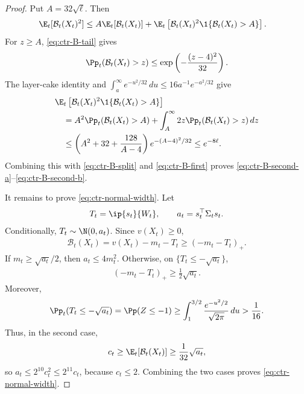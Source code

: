 \begin{proof}
    Put $A=32\sqrt\ell$.  Then
    \begin{align}
        \E_t[\mathcal B_t(X_t)^2]
         & \leq
        A\E_t[\mathcal B_t(X_t)]
        +\E_t\left[
            \mathcal B_t(X_t)^2\1\{\mathcal B_t(X_t)>A\}
            \right].
        \label{eq:ctr-B-split}
    \end{align}
    For $z\geq A$, \eqref{eq:ctr-B-tail} gives
    \begin{align}
        \Pp_t(\mathcal B_t(X_t)>z)
        \leq\exp\left(-\frac{(z-4)^2}{32}\right).
    \end{align}
    The layer-cake identity and
    $\int_a^\infty e^{-u^2/32}\,du\leq16a^{-1}e^{-a^2/32}$ give
    \begin{align}
         & \E_t\left[
            \mathcal B_t(X_t)^2\1\{\mathcal B_t(X_t)>A\}
            \right]
        \\
         & \quad=
        A^2\Pp_t(\mathcal B_t(X_t)>A)
        +\int_A^\infty2z\Pp_t(\mathcal B_t(X_t)>z)\,dz
        \\
         & \quad\leq
        \left(A^2+32+\frac{128}{A-4}\right)
        e^{-(A-4)^2/32}
        \leq e^{-8\ell}.
    \end{align}
    Combining this with \eqref{eq:ctr-B-split} and
    \eqref{eq:ctr-B-first} proves
    \eqref{eq:ctr-B-second-a}--\eqref{eq:ctr-B-second-b}.

    It remains to prove \eqref{eq:ctr-normal-width}.  Let
    \begin{align}
        T_t=\ip{s_t}{W_t},
        \qquad
        a_t=s_t^\top\Sigma_ts_t.
    \end{align}
    Conditionally, $T_t\sim\N(0,a_t)$.  Since $v(X_t)\geq0$,
    \begin{align}
        \mathcal B_t(X_t)
        =v(X_t)-m_t-T_t
        \geq(-m_t-T_t)_+.
        \label{eq:ctr-shortfall}
    \end{align}
    If $m_t\geq\sqrt{a_t}/2$, then $a_t\leq4m_t^2$.  Otherwise, on
    $\{T_t\leq-\sqrt{a_t}\}$,
    \begin{align}
        (-m_t-T_t)_+\geq\frac12\sqrt{a_t}.
    \end{align}
    Moreover,
    \begin{align}
        \Pp_t(T_t\leq-\sqrt{a_t})
        =\Pp(Z\leq-1)
        \geq\int_1^{3/2}\frac{e^{-u^2/2}}{\sqrt{2\pi}}\,du
        >\frac1{16}.
    \end{align}
    Thus, in the second case,
    \begin{align}
        c_t\geq\E_t[\mathcal B_t(X_t)]\geq\frac1{32}\sqrt{a_t},
    \end{align}
    so $a_t\leq2^{10}c_t^2\leq2^{11}c_t$, because $c_t\leq2$.
    Combining the two cases proves \eqref{eq:ctr-normal-width}.
\end{proof}

